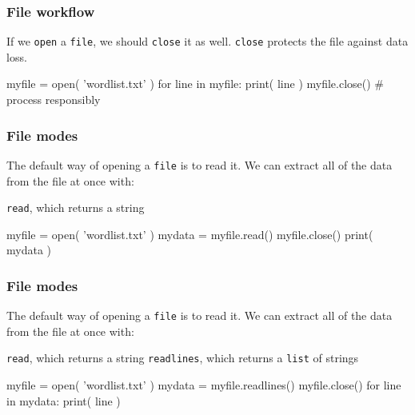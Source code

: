 \documentclass[11pt]{beamer}
\begin{document}
\begin{frame}[fragile]
  \frametitle{File workflow}
  \Enlarge

  \begin{itemize}
  \myitem  If we \texttt{open} a  \texttt{file}, we should \texttt{close} it as well.
  \myitem  \texttt{close} protects the file against data loss.
  \end{itemize}
  \begin{semiverbatim}
myfile = open( 'wordlist.txt' )
for line in myfile:
    print( line )
myfile.close()  # process responsibly
  \end{semiverbatim}
\end{frame}

\begin{frame}[fragile]
  \frametitle{File modes}
  \Enlarge

  \begin{itemize}
  \myitem  The default way of opening a \texttt{file} is to read it.
  \myitem  We can extract all of the data from the file at once with:
    \begin{itemize}
    \mysubitem  \texttt{read}, which returns a string
    \end{itemize}
  \end{itemize}
  \begin{semiverbatim}
myfile = open( 'wordlist.txt' )
mydata = myfile.read()
myfile.close()
print( mydata )
  \end{semiverbatim}
\end{frame}

\begin{frame}[fragile]
  \frametitle{File modes}
  \Enlarge

  \begin{itemize}
  \myitem  The default way of opening a \texttt{file} is to read it.
  \myitem  We can extract all of the data from the file at once with:
    \begin{itemize}
    \mysubitem  \texttt{read}, which returns a string
    \mysubitem  \texttt{readlines}, which returns a \texttt{list} of strings
    \end{itemize}
  \end{itemize}
  \begin{semiverbatim}
myfile = open( 'wordlist.txt' )
mydata = myfile.readlines()
myfile.close()
for line in mydata:
    print( line )
  \end{semiverbatim}
\end{frame}
\end{document}
